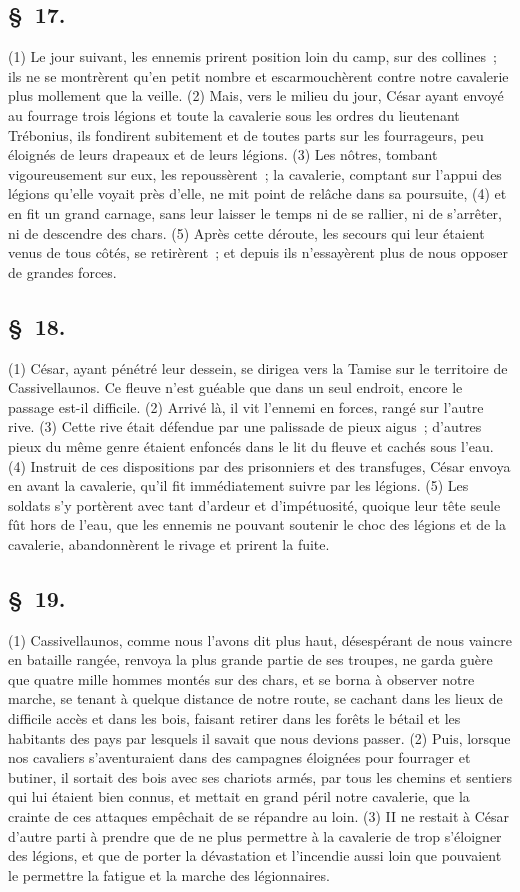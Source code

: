 \documentclass[french,twoside]{book} %
\begin{document}
\subsection[{§ 17.}]{ \textsc{§ 17.} }
\noindent (1) Le jour suivant, les ennemis prirent position loin du camp, sur des collines ; ils ne se montrèrent qu’en petit nombre et escarmouchèrent contre notre cavalerie plus mollement que la veille. (2) Mais, vers le milieu du jour, César ayant envoyé au fourrage trois légions et toute la cavalerie sous les ordres du lieutenant Trébonius, ils fondirent subitement et de toutes parts sur les fourrageurs, peu éloignés de leurs drapeaux et de leurs légions. (3) Les nôtres, tombant vigoureusement sur eux, les repoussèrent ; la cavalerie, comptant sur l’appui des légions qu’elle voyait près d’elle, ne mit point de relâche dans sa poursuite, (4) et en fit un grand carnage, sans leur laisser le temps ni de se rallier, ni de s’arrêter, ni de descendre des chars. (5) Après cette déroute, les secours qui leur étaient venus de tous côtés, se retirèrent ; et depuis ils n’essayèrent plus de nous opposer de grandes forces.
\subsection[{§ 18.}]{ \textsc{§ 18.} }
\noindent (1) César, ayant pénétré leur dessein, se dirigea vers la Tamise sur le territoire de Cassivellaunos. Ce fleuve n’est guéable que dans un seul endroit, encore le passage est-il difficile. (2) Arrivé là, il vit l’ennemi en forces, rangé sur l’autre rive. (3) Cette rive était défendue par une palissade de pieux aigus ; d’autres pieux du même genre étaient enfoncés dans le lit du fleuve et cachés sous l’eau. (4) Instruit de ces dispositions par des prisonniers et des transfuges, César envoya en avant la cavalerie, qu’il fit immédiatement suivre par les légions. (5) Les soldats s’y portèrent avec tant d’ardeur et d’impétuosité, quoique leur tête seule fût hors de l’eau, que les ennemis ne pouvant soutenir le choc des légions et de la cavalerie, abandonnèrent le rivage et prirent la fuite.
\subsection[{§ 19.}]{ \textsc{§ 19.} }
\noindent (1) Cassivellaunos, comme nous l’avons dit plus haut, désespérant de nous vaincre en bataille rangée, renvoya la plus grande partie de ses troupes, ne garda guère que quatre mille hommes montés sur des chars, et se borna à observer notre marche, se tenant à quelque distance de notre route, se cachant dans les lieux de difficile accès et dans les bois, faisant retirer dans les forêts le bétail et les habitants des pays par lesquels il savait que nous devions passer. (2) Puis, lorsque nos cavaliers s’aventuraient dans des campagnes éloignées pour fourrager et butiner, il sortait des bois avec ses chariots armés, par tous les chemins et sentiers qui lui étaient bien connus, et mettait en grand péril notre cavalerie, que la crainte de ces attaques empêchait de se répandre au loin. (3) II ne restait à César d’autre parti à prendre que de ne plus permettre à la cavalerie de trop s’éloigner des légions, et que de porter la dévastation et l’incendie aussi loin que pouvaient le permettre la fatigue et la marche des légionnaires.
\end{document}
